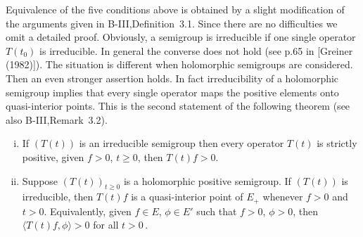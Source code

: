 Equivalence of the five conditions above is obtained by a slight modification of the arguments given in B-III,Definition~3.1.
Since there are no difficulties we omit a detailed proof.
Obviously, a semigroup is irreducible if one single operator $T(t_{0})$ is irreducible.
In general the converse does not hold (see p.65 in [Greiner (1982)]).
The situation is different when holomorphic semigroups are considered.
Then an even stronger assertion holds. In fact irreducibility of a holomorphic semigroup implies that every single operator maps the positive elements onto quasi-interior points.
This is the second statement of the following theorem (see also B-III,Remark~3.2).
\begin{theorem}\label{thm:c3-3.2}
	\begin{enumerate}[(i), wide]
	\item
 	If $(T(t))$ is an irreducible semigroup then every operator $T(t)$ is strictly positive, \ie 
	given $f > 0$, $t \geq 0$, then $T(t)f > 0$.
	
	\item 
	Suppose $(T(t))_{t\geq 0}$ is a holomorphic positive semigroup.
	If $(T(t))$ is irreducible, then $T(t)f$ is a quasi-interior point of $E_{+}$ whenever $f > 0$ and $t > 0$.
	Equivalently, given $f \in E$, $\phi \in E'$ such that $f > 0$, $\phi > 0$, then $\langle T(t)f,\phi \rangle > 0$ for all $t > 0$\,.
	\end{enumerate}
\end{theorem}
%
%
